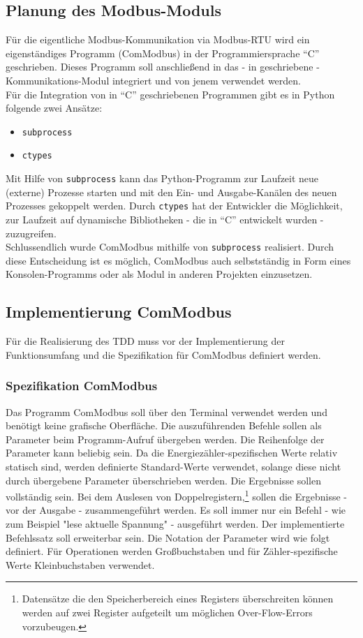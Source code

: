 \documentclass[Bachelorarbeit.tex]{subfiles}
\begin{document}
\subsection{Planung des Modbus-Moduls}
\label{sub:plannung_modbus_modul}
Für die eigentliche Modbus-Kommunikation via Modbus-RTU wird ein eigenständiges Programm (ComModbus) in der Programmiersprache "`C"' geschrieben. 
Dieses Programm soll anschließend in das - in  geschriebene - Kommunikations-Modul integriert und von jenem verwendet werden.
\\
Für die Integration von in "`C"' geschriebenen Programmen gibt es in Python folgende zwei Ansätze:
\begin{itemize}
\item \texttt{subprocess}
\item \texttt{ctypes}
\end{itemize}
Mit Hilfe von \texttt{subprocess} kann das Python-Programm zur Laufzeit neue (externe) Prozesse starten und mit den Ein- und Ausgabe-Kanälen des neuen Prozesses gekoppelt werden.
Durch \texttt{ctypes} hat der Entwickler die Möglichkeit, zur Laufzeit auf dynamische Bibliotheken - die in "`C"' entwickelt wurden - zuzugreifen.\\
Schlussendlich wurde ComModbus mithilfe von \texttt{subprocess} realisiert. 
Durch diese Entscheidung ist es möglich, ComModbus auch selbstständig in Form eines Konsolen-Programms oder als Modul in anderen Projekten einzusetzen.

\subsection{Implementierung ComModbus}
Für die Realisierung des \ac{TDD} muss vor der Implementierung der Funktionsumfang und die Spezifikation für ComModbus definiert werden. 

\subsubsection*{Spezifikation ComModbus}
\label{subsubsec:spez_comModbus}
Das Programm ComModbus soll über den Terminal verwendet werden und benötigt keine grafische Oberfläche.
Die auszuführenden Befehle sollen als Parameter beim Programm-Aufruf übergeben werden. 
Die Reihenfolge der Parameter kann beliebig sein. 
Da die Energiezähler-spezifischen Werte relativ statisch sind, werden definierte Standard-Werte verwendet, solange diese nicht durch übergebene Parameter überschrieben werden. 
Die Ergebnisse sollen vollständig sein. Bei dem Auslesen von Doppelregistern,\footnote{Datensätze die den Speicherbereich eines Registers überschreiten können werden auf zwei Register aufgeteilt um möglichen Over-Flow-Errors vorzubeugen.} sollen die Ergebnisse - vor der Ausgabe - zusammengeführt werden. 
Es soll immer nur ein Befehl - wie zum Beispiel "lese aktuelle Spannung" - ausgeführt werden. 
Der implementierte Befehlssatz soll erweiterbar sein. 
Die Notation der Parameter wird wie folgt definiert. 
Für Operationen werden Großbuchstaben und für Zähler-spezifische Werte Kleinbuchstaben verwendet.
\end{document}
